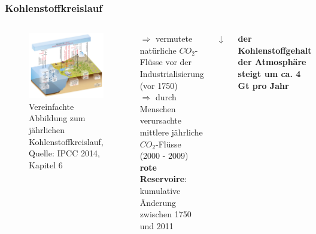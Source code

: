 \begin{frame}
	\frametitle{Kohlenstoffkreislauf}
	
	\begin{columns}
		\begin{figure}
			\centering
			\includegraphics[width=0.9\linewidth]{bilder/IPCC_Cycles_carbon.jpg}
			\caption{Vereinfachte Abbildung zum jährlichen Kohlenstoffkreislauf, Quelle: IPCC 2014, Kapitel 6}
		\end{figure}
		$\Rightarrow$ vermutete natürliche $CO_2$-Flüsse vor der Industrialisierung (vor 1750)\\
		\color{red}$\Rightarrow${ }\color{black} durch Menschen verursachte mittlere jährliche $CO_2$-Flüsse (2000 - 2009) \\%
		\color{red}\textbf{rote Reservoire}\color{black}: kumulative Änderung zwischen 1750 und 2011
		\begin{center}
			$\downarrow$
		\end{center}
		\textbf{der Kohlenstoffgehalt der Atmosphäre steigt um ca. 4 Gt pro Jahr}
	\end{columns}
\end{frame}

